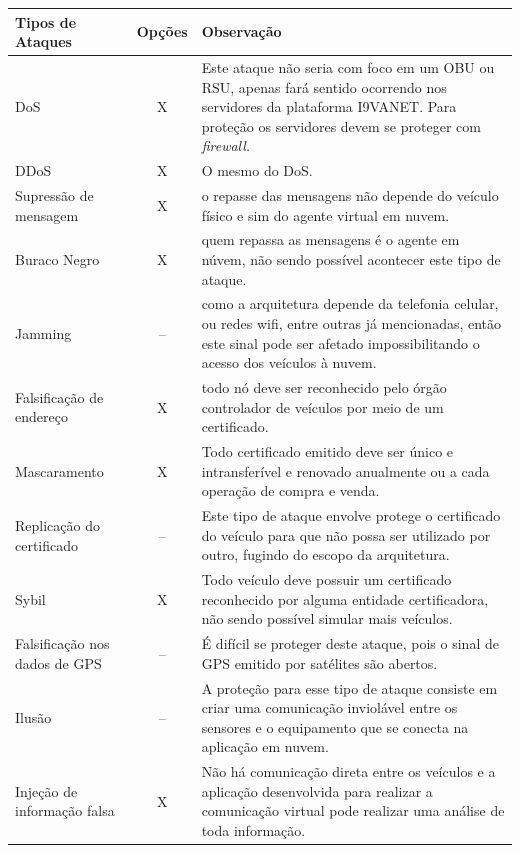 \documentclass[
	12pt,				%
	oneside,			%
	a4paper,			%
	english,			%
	brazil				%
	]{abntex2ppgsi}
\begin{document}
\begin{longtable}{|l|c| p{}|} 
	\hline
		\hline
		\rowcolor[gray]{0.7}
		Tipos de Ataques & Opções & Observação \\ \hline
		DoS	&  X & Este ataque não seria com foco em um OBU ou RSU, apenas fará sentido ocorrendo nos servidores da plataforma I9VANET. Para proteção os servidores devem se proteger com \textit{firewall.}   \\ \hline
		DDoS & X & O mesmo do DoS. \\ \hline
		Supressão de mensagem	&  X &  o repasse das mensagens não depende do veículo físico e sim do agente virtual em nuvem.\\ \hline
		Buraco Negro	& X  & quem repassa as mensagens é o agente em núvem, não sendo possível acontecer este tipo de ataque. \\ \hline
		Jamming	&  -- & como a arquitetura depende da telefonia celular, ou redes wifi, entre outras já mencionadas, então este sinal pode ser afetado impossibilitando o acesso dos veículos à nuvem. \\ \hline
		Falsificação de endereço	&  X & todo nó deve ser reconhecido pelo órgão controlador de veículos por meio de um certificado. \\ \hline
		Mascaramento	&  X & Todo certificado emitido deve ser único e intransferível e renovado anualmente ou a cada operação de compra e venda. \\ \hline
		Replicação do certificado	&  -- & Este tipo de ataque envolve protege o certificado do veículo para que não possa ser utilizado por outro, fugindo do escopo da arquitetura.\\ \hline
		Sybil	&  X & Todo veículo deve possuir um certificado reconhecido por alguma entidade certificadora, não sendo possível simular mais veículos.\\ \hline
		Falsificação nos dados de GPS &  -- & É difícil se proteger deste ataque, pois o sinal de GPS emitido por satélites são abertos.\\ \hline
		Ilusão	&  -- & A proteção para esse tipo de ataque consiste em criar uma comunicação inviolável entre os sensores e o equipamento que se conecta na aplicação em nuvem. \\ \hline
		Injeção de informação falsa	&  X & Não há comunicação direta entre os veículos e a aplicação desenvolvida para realizar a comunicação virtual pode realizar uma análise de toda informação. \\ \hline

\end{longtable}
\end{document}
